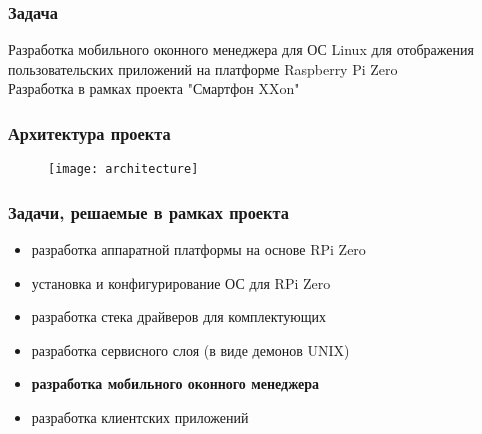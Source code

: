 
\begin{frame}
\frametitle{Задача}

Разработка мобильного оконного менеджера для ОС Linux для отображения пользовательских приложений на платформе Raspberry Pi Zero
\\
Разработка в рамках проекта "Смартфон XXon"
\end{frame}


\begin{frame}
\frametitle{Архитектура проекта}

\begin{figure}
\texttt{[image: architecture]}
\end{figure}

\end{frame}


\begin{frame}
\frametitle{Задачи, решаемые в рамках проекта}

\begin{itemize}
\item разработка аппаратной платформы на основе RPi Zero
\item установка и конфигурирование ОС для RPi Zero
\item разработка стека драйверов для комплектующих
\item разработка сервисного слоя (в виде демонов UNIX)
\item \textbf{разработка мобильного оконного менеджера}
\item разработка клиентских приложений
\end{itemize}

\end{frame}


